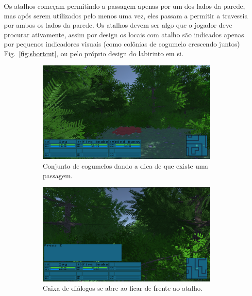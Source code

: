 \documentclass[
	12pt,				%
	openright,			%
	twoside,			%
	a4paper,			%
	english,			%
	french,				%
	spanish,			%
	brazil				%
	]{abntex2}
\begin{document}
	Os atalhos começam permitindo a passagem apenas por um dos lados da parede, mas após serem utilizados pelo menos uma vez, eles passam a permitir a travessia por ambos os lados da parede. Os atalhos devem ser algo que o jogador deve procurar ativamente, assim por design os locais com atalho são indicados apenas por pequenos indicadores visuais (como colônias de cogumelo crescendo juntos) Fig.~\ref{fig:shortcut}, ou pelo próprio design do labirinto em si.

\begin{figure}[h!]
  \centering
  \begin{subfigure}[b]{0.47\linewidth}
    \includegraphics[width=\linewidth]{cogumelos.jpg}
     \caption{Conjunto de cogumelos dando a dica de que existe uma passagem.}
  \end{subfigure}
  \begin{subfigure}[b]{0.47\linewidth}
    \includegraphics[width=\linewidth]{prompt.jpg}
    \caption{Caixa de diálogos se abre ao ficar de frente ao atalho.}
  \end{subfigure}
  \begin{subfigure}[b]{0.47\linewidth}

\end{subfigure}
\end{figure}
\end{document}
